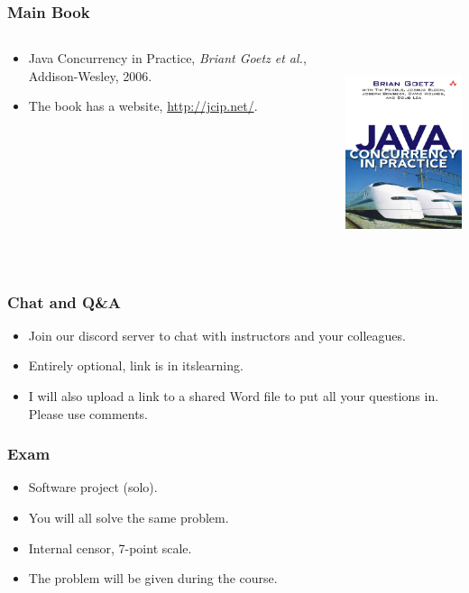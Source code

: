 \documentclass[xcolor={dvipsnames,svgnames},aspectratio=169]{beamer}
\begin{document}
\begin{frame}[fragile]
  \frametitle{Main Book}
  \begin{columns}
    \begin{column}{0.5\textwidth}
      \begin{itemize}
      \item[\faBook] Java Concurrency in Practice, \emph{Briant Goetz et al.},
        Addison-Wesley, 2006.
      \item[\faGlobe] The book has a website, \href{http://jcip.net/}{http://jcip.net/}.
    \end{itemize}
    \end{column}
    \begin{column}{0.5\textwidth}  %
      \begin{center}
        \includegraphics[height=6cm,keepaspectratio]{media/goetz-book.jpg}
      \end{center}
    \end{column}
  \end{columns}
\end{frame}

\begin{frame}[fragile]
  \frametitle{Chat and Q\&A}
  \begin{itemize}
  \item[\faDiscord] Join our discord server to chat with instructors and your
    colleagues.
  \item[\faDiscord] Entirely optional, link is in itslearning.
  \item[\faFileWord] I will also upload a link to a shared Word file to put all
    your questions in. Please use comments.
  \end{itemize}
\end{frame}

\begin{frame}[fragile]
  \frametitle{Exam}
  \begin{itemize}
  \item[\faGraduationCap] Software project (solo).
  \item[\faGraduationCap] You will all solve the same problem.
  \item[\faGraduationCap] Internal censor, 7-point scale.
  \item[\faGraduationCap] The problem will be given during the course.
  \end{itemize}
\end{frame}
\end{document}
